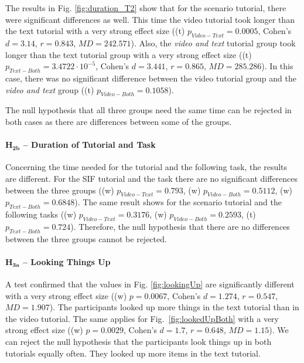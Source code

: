The results in Fig. \ref{fig:duration_T2} show that for the scenario tutorial, there were significant differences as well. This time the video tutorial took longer than the text tutorial with a very strong effect size ((t) $p_{\mathit{Video-Text}}=0.0005$, Cohen's $d=3.14$, $r=0.843$, $\mathit{MD}=242.571$). Also, the \textit{video and text} tutorial group took longer than the text tutorial group with a very strong effect size ((t) $p_{\mathit{Text-Both}}=3.4722 \cdot 10^{-5}$, Cohen's $d=3.441$, $r=0.865$, $\mathit{MD}=285.286$). In this case, there was no significant difference between the video tutorial group and the \textit{video and text} group ((t) $p_{\mathit{Video-Both}}=0.1058$). 


The null hypothesis that all three groups need the same time can be rejected in both cases as there are differences between some of the groups. 


\paragraph{$\mathbf{H_{2b}}$ -- Duration of Tutorial and Task}
Concerning the time needed for the tutorial and the following task, the results are different. For the SIF tutorial and the task there are no significant differences between the three groups ((w) $p_{\mathit{Video-Text}}=0.793$, (w) $p_{\mathit{Video-Both}}=0.5112$, (w) $p_{\mathit{Text-Both}}=0.6848$). The same result shows for the scenario tutorial and the following tasks ((w) $p_{\mathit{Video-Text}}=0.3176$, (w) $p_{\mathit{Video-Both}}=0.2593$, (t) $p_{\mathit{Text-Both}}=0.724$). Therefore, the null hypothesis that there are no differences between the three groups cannot be rejected. 



\paragraph{$\mathbf{H_{3a}}$ -- Looking Things Up}
\label{H3a}
A test confirmed that the values in Fig. \ref{fig:lookingUp} are significantly different with a very strong effect size ((w) $p=0.0067$, Cohen's $d=1.274$, $r=0.547$, $\mathit{MD}=1.907$). The participants looked up more things in the text tutorial than in the video tutorial. The same applies for Fig.~\ref{fig:lookedUpBoth} with a very strong effect size ((w) $p=0.0029$, Cohen's $d=1.7$, $r=0.648$, $\mathit{MD}=1.15$). We can reject the null hypothesis that the participants look things up in both tutorials equally often. They looked up more items in the text tutorial. 


